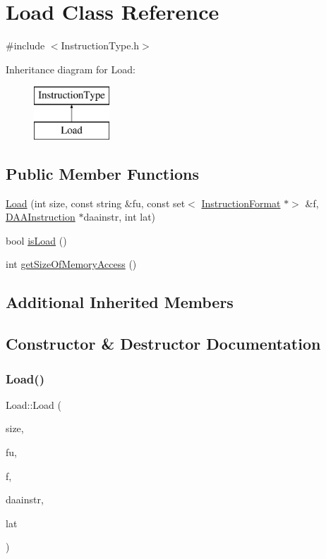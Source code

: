 \hypertarget{classLoad}{}\section{Load Class Reference}
\label{classLoad}


{\ttfamily \#include $<$Instruction\+Type.\+h$>$}

Inheritance diagram for Load\+:\begin{figure}[H]
\begin{center}
\leavevmode
\includegraphics[height=2.000000cm]{classLoad}
\end{center}
\end{figure}
\subsection*{Public Member Functions}
\begin{DoxyCompactItemize}
\item 
\hyperlink{classLoad_a31df9cdc72b2e48362ee6c29b7fdbc96}{Load} (int size, const string \&fu, const set$<$ \hyperlink{classInstructionFormat}{Instruction\+Format} $\ast$$>$ \&f, \hyperlink{classDAAInstruction}{D\+A\+A\+Instruction} $\ast$daainstr, int lat)
\item 
bool \hyperlink{classLoad_aa7fbffafad6cbfa1b9866f6d09cc7e30}{is\+Load} ()
\item 
int \hyperlink{classLoad_a35d504d74dfa9ea02ae719f41dd766a8}{get\+Size\+Of\+Memory\+Access} ()
\end{DoxyCompactItemize}
\subsection*{Additional Inherited Members}


\subsection{Constructor \& Destructor Documentation}
\mbox{\label{classLoad_a31df9cdc72b2e48362ee6c29b7fdbc96}} 
\subsubsection{\texorpdfstring{Load()}{Load()}}
{\footnotesize\ttfamily Load\+::\+Load (\begin{DoxyParamCaption}\item[{int}]{size,  }\item[{const string \&}]{fu,  }\item[{const set$<$ \hyperlink{classInstructionFormat}{Instruction\+Format} $\ast$$>$ \&}]{f,  }\item[{\hyperlink{classDAAInstruction}{D\+A\+A\+Instruction} $\ast$}]{daainstr,  }\item[{int}]{lat }\end{DoxyParamCaption})}



